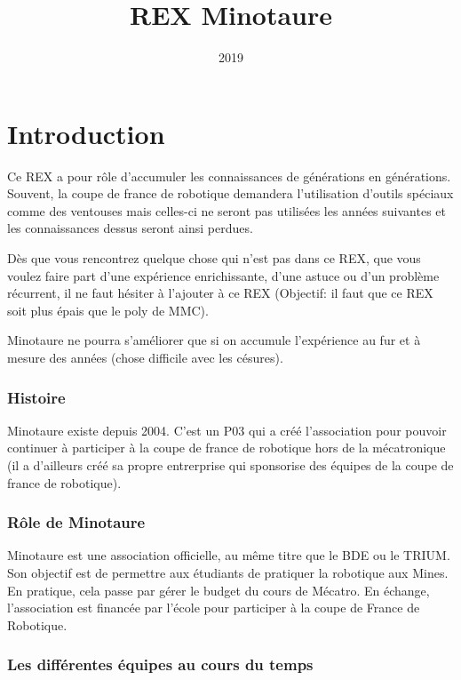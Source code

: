 \documentclass[a4paper, 11pt]{report}
\title{REX Minotaure}
\date{2019}
\begin{document}
\maketitle

\tableofcontents

\part{Introduction}

Ce REX a pour rôle d'accumuler les connaissances de générations en générations. Souvent, la coupe de france de robotique demandera l'utilisation d'outils spéciaux comme des ventouses mais celles-ci ne seront pas utilisées les années suivantes et les connaissances dessus seront ainsi perdues.

Dès que vous rencontrez quelque chose qui n'est pas dans ce REX, que vous voulez faire part d'une expérience enrichissante, d'une astuce ou d'un problème récurrent, il ne faut hésiter à l'ajouter à ce REX (Objectif: il faut que ce REX soit plus épais que le poly de MMC).

Minotaure ne pourra s'améliorer que si on accumule l'expérience au fur et à mesure des années (chose difficile avec les césures).

\section{Histoire}
Minotaure existe depuis 2004. C'est un P03 qui a créé l'association pour pouvoir continuer à participer à la coupe de france de robotique hors de la mécatronique (il a d'ailleurs créé sa propre entrerprise qui sponsorise des équipes de la coupe de france de robotique).

\section{Rôle de Minotaure}
Minotaure est une association officielle, au même titre que le BDE ou le TRIUM. Son objectif est de permettre aux étudiants de pratiquer la robotique aux Mines. En pratique, cela passe par gérer le budget du cours de Mécatro. En échange, l'association est financée par l'école pour participer à la coupe de France de Robotique.


\section{Les différentes équipes au cours du temps}
\end{document}
